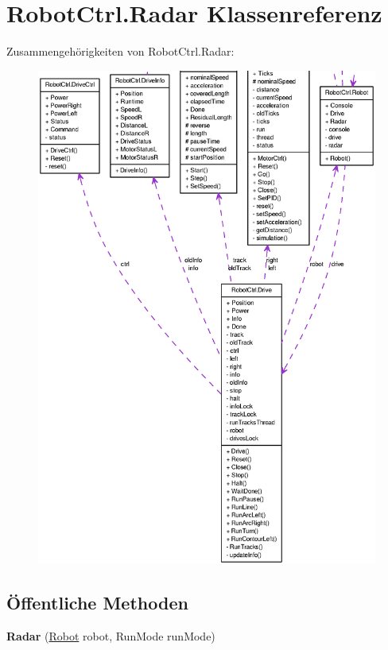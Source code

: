 \hypertarget{class_robot_ctrl_1_1_radar}{
\section{RobotCtrl.Radar Klassenreferenz}
\label{class_robot_ctrl_1_1_radar}
}


Zusammengehörigkeiten von RobotCtrl.Radar:\nopagebreak
\begin{figure}[H]
\begin{center}
\leavevmode
\includegraphics[width=400pt]{class_robot_ctrl_1_1_radar__coll__graph}
\end{center}
\end{figure}
\subsection*{Öffentliche Methoden}
\begin{DoxyCompactItemize}
\item 
\hypertarget{class_robot_ctrl_1_1_radar_aec75e7f4e126ac40c008c5d30d1c8dba}{
{\bfseries Radar} (\hyperlink{class_robot_ctrl_1_1_robot}{Robot} robot, RunMode runMode)}
\label{class_robot_ctrl_1_1_radar_aec75e7f4e126ac40c008c5d30d1c8dba}

\end{DoxyCompactItemize}
